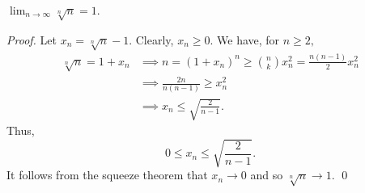 \begin{theorem}
    \label{thm3.20c}
    $\lim_{n\to\infty} \sqrt[n]{n}= 1$.
\end{theorem}

\begin{proof}
    Let $x_n= \sqrt[n]{n} -1.$ Clearly, $x_n \geq 0$. We have, for $n \geq 2,$
    \begin{align*}
        \sqrt[n]{n} = 1 + x_n &\implies n = (1+ x_n)^n \geq \binom{n}{k} x_n^2 = \frac{n(n-1)}{2}x_n^2 \\
        &\implies \frac{2n}{n(n-1)} \geq x_n^2 \\
        &\implies x_n \leq \sqrt{\frac{2}{n-1}}.
    \end{align*}
    Thus,
    $$0 \leq x_n \leq \sqrt{\frac{2}{n-1}}.$$
    It follows from the squeeze theorem that $x_n \to 0$ and so $\sqrt[n]{n} \to 1$.
    \qed
\end{proof}